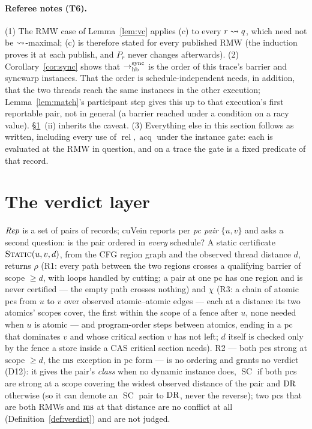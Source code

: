 \documentclass[11pt]{article}
\theoremstyle{remark}
\DeclareMathOperator{\rel}{rel}\DeclareMathOperator{\acq}{acq}\DeclareMathOperator{\key}{key}
\DeclareMathOperator{\SC}{SC}
\begin{document}
\paragraph{Referee notes (T6).} (1) The RMW case of Lemma~\ref{lem:vc} applies (c) to every
$r\rightsquigarrow q$, which need not be $\rightsquigarrow$-maximal; (c) is therefore stated for every published
RMW (the induction proves it at each publish, and $P_r$ never changes afterwards). (2)
Corollary~\ref{cor:sync} shows that $\to_{\mathrm{hb}}^{\mathrm{sync}}$ is the order of this trace's barrier
and syncwarp instances. That the order is schedule-independent needs, in addition, that the
two threads reach the same instances in the other execution; Lemma~\ref{lem:match}'s
participant step gives this up to that execution's first reportable pair, not in general (a
barrier reached under a condition on a racy value). \S\ref{sec:verdict}~(ii) inherits the
caveat. (3) Everything else in this section follows as written, including every use of
$\rel,\acq$ under the instance gate: each is evaluated at the RMW in question, and on a
trace the gate is a fixed predicate of that record.

\section{The verdict layer}\label{sec:verdict}

$\mathit{Rep}$ is a set of pairs of records; cuVein reports per \emph{pc pair}
$\{u,v\}$ and asks a second question: is the pair ordered in \emph{every} schedule? A
static certificate $\textsc{Static}(u,v,d)$, from the CFG region graph and the observed
thread distance $d$, returns $\rho$ (R1: every path between the two regions crosses a
qualifying barrier of scope $\ge d$, with loops handled by cutting; a pair at one pc has one
region and is never certified --- the empty path crosses nothing) and $\chi$
(R3: a chain of atomic pcs from $u$ to $v$ over observed atomic--atomic edges --- each at a
distance its two atomics' scopes cover, the first within the scope of a fence after $u$, none
needed when $u$ is atomic --- and program-order steps between atomics, ending in a pc that
dominates $v$ and whose critical section $v$ has not left; $d$ itself is checked only by the
fence a store inside a CAS critical section needs). R2 --- both pcs strong at scope $\ge d$,
the $\operatorname{ms}$ exception in pc form --- is no ordering and grants no verdict (D12): it gives the
pair's \emph{class} when no dynamic instance does, $\SC$ if both pcs are strong at a scope
covering the widest observed distance of the pair and $\operatorname{DR}$ otherwise (so it can demote an
$\SC$ pair to $\operatorname{DR}$, never the reverse); two pcs that are both RMWs and $\operatorname{ms}$ at that distance
are no conflict at all (Definition~\ref{def:verdict}) and are not judged.
\end{document}
